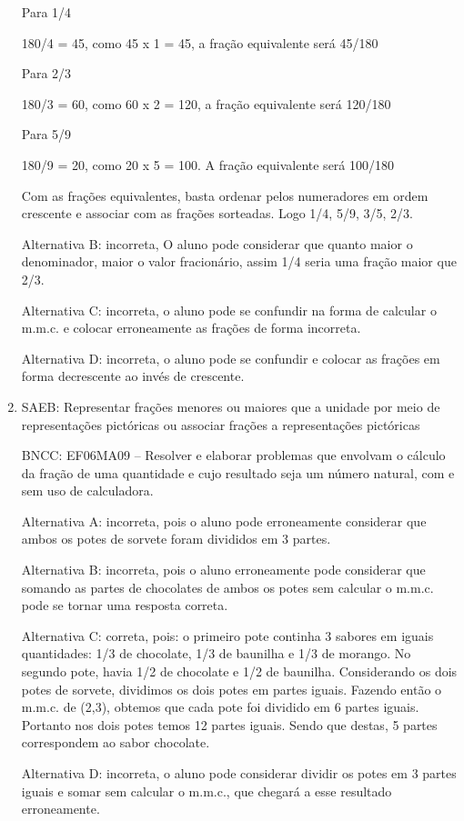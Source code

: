\begin{enumerate}
Para 1/4

180/4 = 45, como 45 x 1 = 45, a fração equivalente será 45/180

Para 2/3

180/3 = 60, como 60 x 2 = 120, a fração equivalente será 120/180

Para 5/9

180/9 = 20, como 20 x 5 = 100. A fração equivalente será 100/180

Com as frações equivalentes, basta ordenar pelos numeradores em ordem
crescente e associar com as frações sorteadas. Logo 1/4, 5/9, 3/5, 2/3.

Alternativa B: incorreta, O aluno pode considerar que quanto maior o
denominador, maior o valor fracionário, assim 1/4 seria uma fração maior
que 2/3.

Alternativa C: incorreta, o aluno pode se confundir na forma de calcular
o m.m.c. e colocar erroneamente as frações de forma incorreta.

Alternativa D: incorreta, o aluno pode se confundir e colocar as frações
em forma decrescente ao invés de crescente.

		\item SAEB: Representar frações menores ou maiores que a unidade por meio de
representações pictóricas ou associar frações a representações
pictóricas

BNCC: EF06MA09 -- Resolver e elaborar problemas que envolvam o cálculo
da fração de uma quantidade e cujo resultado seja um número natural, com
e sem uso de calculadora.

Alternativa A: incorreta, pois o aluno pode erroneamente considerar que
ambos os potes de sorvete foram divididos em 3 partes.

Alternativa B: incorreta, pois o aluno erroneamente pode considerar que
somando as partes de chocolates de ambos os potes sem calcular o m.m.c.
pode se tornar uma resposta correta.

Alternativa C: correta, pois: o primeiro pote continha 3 sabores em
iguais quantidades: 1/3 de chocolate, 1/3 de baunilha e 1/3 de morango.
No segundo pote, havia 1/2 de chocolate e 1/2 de baunilha. Considerando
os dois potes de sorvete, dividimos os dois potes em partes iguais.
Fazendo então o m.m.c. de (2,3), obtemos que cada pote foi dividido em 6
partes iguais. Portanto nos dois potes temos 12 partes iguais. Sendo que
destas, 5 partes correspondem ao sabor chocolate.

Alternativa D: incorreta, o aluno pode considerar dividir os potes em 3
partes iguais e somar sem calcular o m.m.c., que chegará a esse
resultado erroneamente.

	\end{enumerate}

